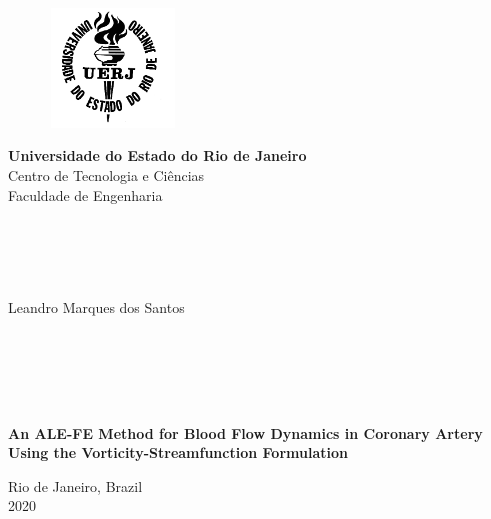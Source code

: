 \begin{titlepage}
\begin{center}

	\vspace{-0.5cm}

  \begin{figure}[hbt!]
		\begin{flushleft}
		   \includegraphics[width=3.44cm,height=3.17cm]{logos/logo_uerj_bw}
		\end{flushleft}
	\end{figure}
	\vspace{-4cm}

  \hspace{2cm}\large{\textbf{Universidade do Estado do Rio de Janeiro}}\\
  \hspace{2cm}\large{Centro de Tecnologia e Ciências}\\
  \hspace{2cm}\large{Faculdade de Engenharia}\\

  \hspace{2cm}\large{}\\
  \hspace{2cm}\large{}\\
  \hspace{2cm}\large{}\\
  \hspace{2cm}\large{}\\

  \par
  \Large{Leandro Marques dos Santos}

  \hspace{2cm}\large{}\\
  \hspace{2cm}\large{}\\
  \hspace{2cm}\large{}\\
  \hspace{2cm}\large{}\\


  \par
  \textbf{\LARGE An ALE-FE Method for Blood Flow Dynamics in Coronary Artery Using the Vorticity-Streamfunction Formulation}

  \par\vfill
  {\large Rio de Janeiro, Brazil\\2020}

\end{center}
\end{titlepage}
